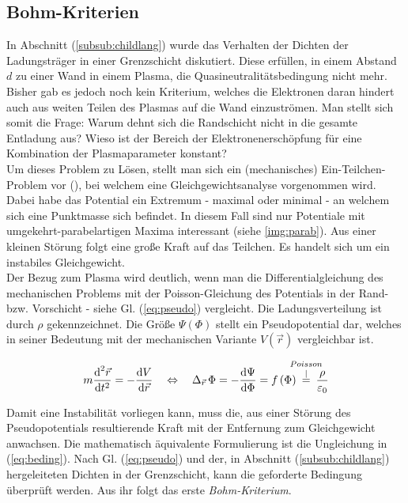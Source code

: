\documentclass[numbers=noenddot,a4paper,notitlepage,twoside,BCOR15mm]{scrbook}
\newcommand{\diff}{\textnormal{d}}
\newcommand{\ix}[1]{_\text{#1}}
\newcommand{\tilt}[1]{\textit{#1}}
\begin{document}
		\subsection{Bohm-Kriterien}

			In Abschnitt (\ref{subsub:childlang}) wurde das Verhalten der Dichten der Ladungstr\"ager in einer Grenzschicht diskutiert. Diese erf\"ullen, in einem Abstand $d$ zu einer Wand in einem Plasma, die Quasineutralit\"atsbedingung nicht mehr. Bisher gab es jedoch noch kein Kriterium, welches die Elektronen daran hindert auch aus weiten Teilen des Plasmas auf die Wand einzustr\"omen. Man stellt sich somit die Frage: Warum dehnt sich die Randschicht nicht in die gesamte Entladung aus? Wieso ist der Bereich der Elektronenersch\"opfung f\"ur eine Kombination der Plasmaparameter konstant? \\
			Um dieses Problem zu L\"osen, stellt man sich ein (mechanisches) Ein-Teilchen-Problem vor (\cite{Piel10}), bei welchem eine Gleichgewichtsanalyse vorgenommen wird. Dabei habe das Potential ein Extremum - maximal oder minimal - an welchem sich eine Punktmasse sich befindet. In diesem Fall sind nur Potentiale mit umgekehrt-parabelartigen Maxima interessant (siehe \ref{img:parab}). Aus einer kleinen St\"orung folgt eine gro{\ss}e Kraft auf das Teilchen. Es handelt sich um ein instabiles Gleichgewicht.\\
			Der Bezug zum Plasma wird deutlich, wenn man die Differentialgleichung des mechanischen Problems mit der Poisson-Gleichung des Potentials in der Rand- bzw. Vorschicht - siehe Gl. (\ref{eq:pseudo}) vergleicht. Die Ladungsverteilung ist durch $\rho$ gekennzeichnet. Die Größe $\Psi\left(\Phi\right)$ stellt ein Pseudopotential dar, welches in seiner Bedeutung mit der mechanischen Variante $V\left(\vec{r}\right)$ vergleichbar ist.

				\begin{align}
					m\frac{\diff^{2}\vec{r}}{\diff t^{2}}=-\frac{\diff V}{\diff\vec{r}} \quad \Leftrightarrow \quad \Delta_{\vec{r}}\,\Phi=-\frac{\diff\Psi}{\diff\Phi}=f\left(\Phi\right)\hspace{-0.3cm}\overset{Poisson}{\overset{\mid}{=}}\hspace{-0.3cm}\frac{\rho}{\varepsilon\ix{0}} \label{eq:pseudo}
				\end{align}

			Damit eine Instabilit\"at vorliegen kann, muss die, aus einer St\"orung des Pseudopotentials resultierende Kraft mit der Entfernung zum Gleichgewicht anwachsen. Die mathematisch \"aquivalente Formulierung ist die Ungleichung in (\ref{eq:beding}). Nach Gl. (\ref{eq:pseudo}) und der, in Abschnitt (\ref{subsub:childlang}) hergeleiteten Dichten in der Grenzschicht, kann die geforderte Bedingung \"uberpr\"uft werden. Aus ihr folgt das erste \tilt{Bohm-Kriterium}.
\end{document}
